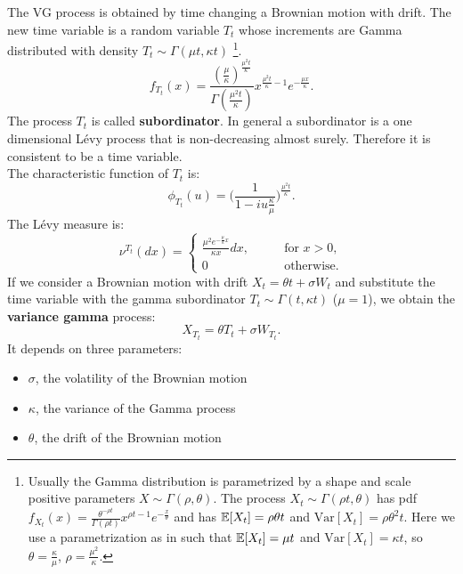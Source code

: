 The VG process is obtained by time changing a Brownian motion with drift. The new time variable is a random variable 
$T_t$ whose increments are Gamma distributed with density $T_t \sim \Gamma(\mu t,\kappa t)$ \footnote{Usually the Gamma distribution is 
parametrized by a shape and scale positive parameters $X \sim \Gamma(\rho,\theta)$. The process $X_t \sim \Gamma(\rho t,\theta)$ 
has pdf 
$f_{X_t}(x) = \frac{\theta^{-\rho t}}{\Gamma(\rho t)}x^{\rho t -1}e^{-\frac{x}{\theta}}$ and has $\mathbb{E}[X_t]=\rho \theta t$ 
and $\mbox{Var}[X_t] = \rho \theta^2 t$. Here we use a parametrization as in \cite{MCC98} such that $\mathbb{E}[X_t]=\mu t$ and $\mbox{Var}
[X_t] = \kappa t$, so $\theta=\frac{\kappa}{\mu}$, $\rho=\frac{\mu^2}{\kappa}$.}.
\begin{equation}
 f_{T_t}(x)= \frac{(\frac{\mu}{\kappa})^{\frac{\mu^2 t}{\kappa}}}{\Gamma(\frac{\mu^2 t}{\kappa})}x^{\frac{\mu^2 t}{\kappa} -1}
 e^{-\frac{\mu x}{\kappa}}.
\end{equation}
The process $T_t$ is called \textbf{subordinator}. In general a subordinator is a one dimensional Lévy process that is 
non-decreasing almost surely. Therefore it is consistent to be a time variable.\\
The characteristic function of $T_t$ is:
\begin{equation}
 \phi_{T_t}(u) = \biggl( \frac{1}{1-iu\frac{\kappa}{\mu}} \biggr)^{\frac{\mu^2 t}{\kappa}} . 
\end{equation}
The Lévy measure is:
\begin{equation}
 \nu^{T_t}(dx) = \begin{cases}
            \frac{\mu^2 e^{-\frac{\mu}{\kappa}x}}{\kappa x} dx, & \hspace{2em} \mbox{for } x>0,\\
            0 & \hspace{2em} \mbox{otherwise.}
           \end{cases}
\end{equation}
\newline
If we consider a Brownian motion with drift $X_t = \theta t + \sigma W_t$ and substitute the time variable with the gamma subordinator
$T_t \sim \Gamma(t,\kappa t)$ ($\mu=1$),
we obtain the \textbf{variance gamma} process:
\begin{equation}\label{VG_process}
 X_{T_t} = \theta T_t + \sigma W_{T_t} .
\end{equation}
It depends on three parameters:
\begin{itemize}
 \item $\sigma$, the volatility of the Brownian motion
 \item $\kappa$, the variance of the Gamma process
 \item $\theta$, the drift of the Brownian motion
\end{itemize}
